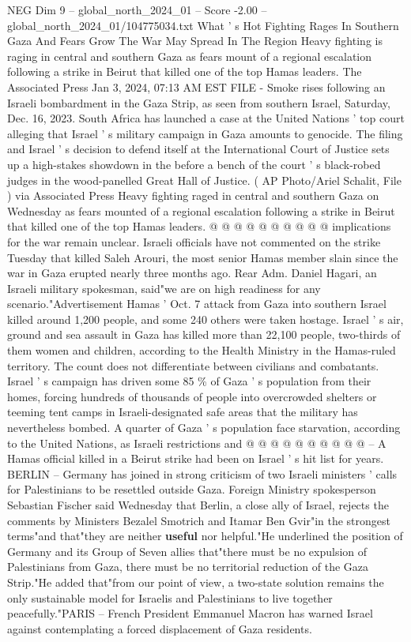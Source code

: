 \begin{textsample}{NEG Dim 9 – global\_north\_2024\_01 – Score -2.00 – global\_north\_2024\_01/104775034.txt}  \label{ex:f9_neg_189}
What ' s Hot Fighting Rages In Southern Gaza And Fears Grow The War May Spread In The Region Heavy fighting is raging in central and southern Gaza as fears mount of a regional escalation following a strike in Beirut that killed one of the top Hamas leaders.
The Associated Press Jan 3, 2024, 07:13 AM EST FILE - Smoke rises following an Israeli bombardment in the Gaza Strip, as seen from southern Israel, Saturday, Dec. 16, 2023.
South Africa has launched a case at the United Nations ' top court alleging that Israel ' s military campaign in Gaza amounts to genocide.
The filing and Israel ' s decision to defend itself at the International Court of Justice sets up a high-stakes showdown in the before a bench of the court ' s black-robed judges in the wood-panelled Great Hall of Justice. ( AP Photo/Ariel Schalit, File ) via Associated Press Heavy fighting raged in central and southern Gaza on Wednesday as fears mounted of a regional escalation following a strike in Beirut that killed one of the top Hamas leaders. @ @ @ @ @ @ @ @ @ @ implications for the war remain unclear.
Israeli officials have not commented on the strike Tuesday that killed Saleh Arouri, the most senior Hamas member slain since the war in Gaza erupted nearly three months ago.
Rear Adm.
Daniel Hagari, an Israeli military spokesman, said"we are on high readiness for any scenario."Advertisement Hamas ' Oct. 7 attack from Gaza into southern Israel killed around 1,200 people, and some 240 others were taken hostage.
Israel ' s air, ground and sea assault in Gaza has killed more than 22,100 people, two-thirds of them women and children, according to the Health Ministry in the Hamas-ruled territory.
The count does not differentiate between civilians and combatants.
Israel ' s campaign has driven some 85 \% of Gaza ' s population from their homes, forcing hundreds of thousands of people into overcrowded shelters or teeming tent camps in Israeli-designated safe areas that the military has nevertheless bombed.
A quarter of Gaza ' s population face starvation, according to the United Nations, as Israeli restrictions and @ @ @ @ @ @ @ @ @ @ -- A Hamas official killed in a Beirut strike had been on Israel ' s hit list for years.
BERLIN -- Germany has joined in strong criticism of two Israeli ministers ' calls for Palestinians to be resettled outside Gaza.
Foreign Ministry spokesperson Sebastian Fischer said Wednesday that Berlin, a close ally of Israel, rejects the comments by Ministers Bezalel Smotrich and Itamar Ben Gvir"in the strongest terms"and that"they are neither \textbf{useful} nor helpful."He underlined the position of Germany and its Group of Seven allies that"there must be no expulsion of Palestinians from Gaza, there must be no territorial reduction of the Gaza Strip."He added that"from our point of view, a two-state solution remains the only sustainable model for Israelis and Palestinians to live together peacefully."PARIS -- French President Emmanuel Macron has warned Israel against contemplating a forced displacement of Gaza residents.

\end{textsample}
